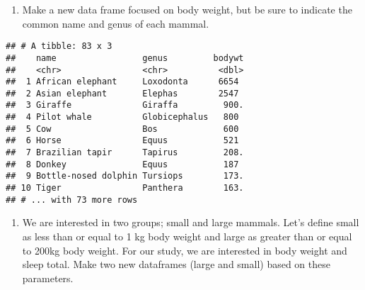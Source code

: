 \documentclass[]{article}
\newenvironment{Shaded}{\begin{snugshade}}{\end{snugshade}}
\newcommand{\KeywordTok}[1]{\textcolor[rgb]{0.13,0.29,0.53}{\textbf{#1}}}
\newcommand{\DecValTok}[1]{\textcolor[rgb]{0.00,0.00,0.81}{#1}}
\newcommand{\StringTok}[1]{\textcolor[rgb]{0.31,0.60,0.02}{#1}}
\newcommand{\OperatorTok}[1]{\textcolor[rgb]{0.81,0.36,0.00}{\textbf{#1}}}
\newcommand{\NormalTok}[1]{#1}
\providecommand{\tightlist}{%
  \setlength{\itemsep}{0pt}\setlength{\parskip}{0pt}}
\begin{document}
\begin{enumerate}
\def\labelenumi{\arabic{enumi}.}
\setcounter{enumi}{2}
\tightlist
\item
  Make a new data frame focused on body weight, but be sure to indicate
  the common name and genus of each mammal.
\end{enumerate}

\begin{Shaded}
\end{Shaded}

\begin{verbatim}
## # A tibble: 83 x 3
##    name                 genus         bodywt
##    <chr>                <chr>          <dbl>
##  1 African elephant     Loxodonta      6654 
##  2 Asian elephant       Elephas        2547 
##  3 Giraffe              Giraffa         900.
##  4 Pilot whale          Globicephalus   800 
##  5 Cow                  Bos             600 
##  6 Horse                Equus           521 
##  7 Brazilian tapir      Tapirus         208.
##  8 Donkey               Equus           187 
##  9 Bottle-nosed dolphin Tursiops        173.
## 10 Tiger                Panthera        163.
## # ... with 73 more rows
\end{verbatim}

\begin{enumerate}
\def\labelenumi{\arabic{enumi}.}
\setcounter{enumi}{3}
\tightlist
\item
  We are interested in two groups; small and large mammals. Let's define
  small as less than or equal to 1 kg body weight and large as greater
  than or equal to 200kg body weight. For our study, we are interested
  in body weight and sleep total. Make two new dataframes (large and
  small) based on these parameters.
\end{enumerate}

\begin{Shaded}
\end{Shaded}
\end{document}
